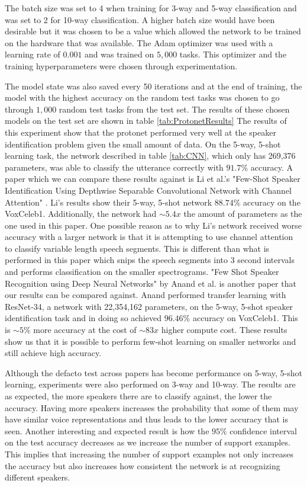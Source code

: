 \documentclass{article}
\begin{document}
The batch size was set to 4 when training for 3-way and 5-way classification and was set to 2 for 10-way classification.
A higher batch size would have been desirable but it was chosen to be a value which allowed the network to be trained on
the hardware that was available. The Adam optimizer was used with a learning rate of $0.001$ and was trained on $5,000$ 
tasks. This optimizer and the training hyperparameters were chosen through experimentation.

The model state was also saved every 50 iterations and at the end of training, the model with the highest accuracy on 
the random test tasks was chosen to go through $1,000$ random test tasks from the test set. The results of these chosen models
on the test set are shown in table \ref{tab:ProtonetResults} The results of this experiment show that the protonet 
performed very well at the speaker identification problem given the small amount of data. On the 5-way, 5-shot learning task,
the network described in table \ref{tab:CNN}, which only has 269,376 parameters, was able to classify the utterance correctly
with $91.7\%$ accuracy. A paper which we can compare these results against is Li et al.'s "Few-Shot Speaker Identification Using Depthwise Separable Convolutional Network with Channel Attention"
\cite{FewShotSpeakerIDChannelAttention}. Li's results show their 5-way, 5-shot network $88.74\%$ accuracy on the VoxCeleb1.
Additionally, the network had $\sim5.4x$ the amount of parameters as the one used in this paper. One possible reason as 
to why Li's network received worse accuracy with a larger network is that it is attempting to use channel attention to classify
variable length speech segments. This is different than what is performed in this paper which snips the speech segments into 
3 second intervals and performs classification on the smaller spectrograms. "Few Shot Speaker Recognition using Deep Neural Networks" \cite{FewShotSpeakerRecognition}
by Anand et al. is another paper that our results can be compared against. Anand performed transfer learning with ResNet-34, a
network with 22,354,162 parameters, on the 5-way, 5-shot speaker identification task and in doing so achieved $96.46\%$ accuracy
on VoxCeleb1. This is $\sim5\%$ more accuracy at the cost of $\sim83x$ higher compute cost. These results show us that it
is possible to perform few-shot learning on smaller networks and still achieve high accuracy.

Although the defacto test across papers has become performance on 5-way, 5-shot learning, experiments were also performed
on 3-way and 10-way. The results are as expected, the more speakers there are to classify against, the lower the accuracy.
Having more speakers increases the probability that some of them may have similar voice representations and thus leads to
the lower accuracy that is seen. Another interesting and expected result is how the $95\%$ confidence interval on the test
accuracy decreases as we increase the number of support examples. This implies that increasing the number of support examples
not only increases the accuracy but also increases how consistent the network is at recognizing different speakers.
\end{document}
